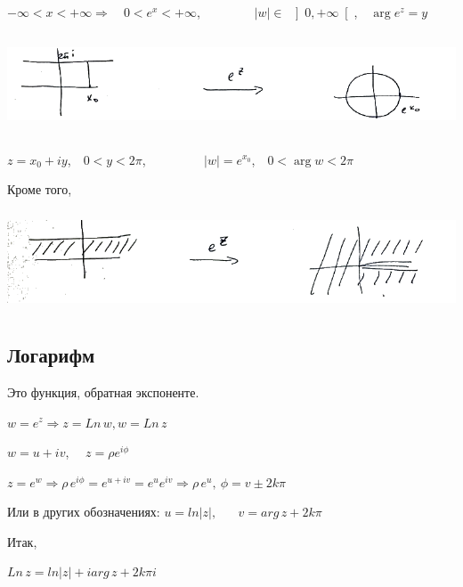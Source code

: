 \documentclass[a4paper, 12pt]{report}
\begin{document}
$-\infty<x<+\infty$\quad$\Rightarrow$$\quad$$0<e^x<+\infty$,$\qquad$ $\qquad$$|w|\in$ $\left]0,+\infty\right[$,$\quad$$\arg e^z=y$

\par\bigskip

\includegraphics[width=16cm, height=3cm]{exponenta 7/exp2.png}

 $z=x_0+iy$,$\quad$$0<y<2\pi$,$\qquad$ $\qquad$ $|w|=e^{x_0}$,$\quad$$0<\arg w<2\pi$
\par\bigskip
Кроме того,

\includegraphics[width=14cm, height=3cm]{exponenta 7/exp3.png}

\subsection{Логарифм}
\begin{center}
    \par{}
\end{center}
\par\bigskip
Это функция, обратная экспоненте.
\par\bigskip
$w=e^z $\quad$\Rightarrow$\quad$ z=Ln\,w,$\quad$w=Ln\,z$
\par\bigskip
$w=u+iv$,$\quad$ $ z=\rho e^{i\phi}$
\par\bigskip
$z=e^w$\quad$\Rightarrow$\quad$\rho\,e^{i\phi}=e^{u+iv}=e^{u}e^{iv}$\quad$\Rightarrow$\quad$\rho\,e^u,\ \phi=v\pm 2k\pi$

\par\bigskip

Или в других обозначениях:
$u=ln|z|,$ $\quad$ $v=arg\,z+2k\pi$
\par\bigskip

Итак,
\begin{center}
    \par\bigskip $Ln\,z=ln|z|+iarg\,z+2k\pi i$
\end{center}
\end{document}
